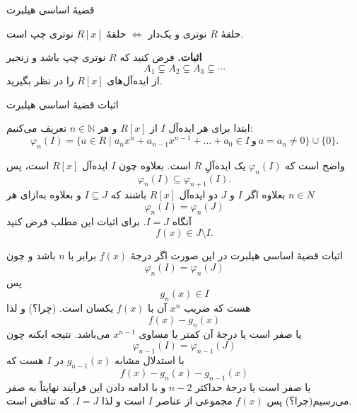 \begin{frame}{قضیهٔ اساسی هیلبرت}
    \begin{theorem}

        \begin{center}
            حلقهٔ $R$ نوتری و یک‌دار $\iff$ حلقهٔ $R[x]$ نوتری چپ است.
        \end{center}
    \end{theorem}

    \textbf{اثبات.}  فرض کنید که $R$ نوتری چپ باشد و زنجیر
    \[
        A_1 \subsetneq A_2 \subsetneq A_3 \subsetneq \cdots
    \]
    از ایده‌آل‌های $R[x]$ را در نظر بگیرید.
\end{frame}

\begin{frame}{اثبات قضیهٔ اساسی هیلبرت}


    ابتدا برای هر ایده‌آل $I$ از $R[x]$ و هر $n \in \mathbb{N}$ تعریف می‌کنیم:
    \[
        \varphi_n(I) = \{ a \in R \mid a_n x^n + a_{n-1} x^{n-1} + \dots + a_0 \in I \ \text{و} \ a = a_n \neq 0 \} \cup \{0\}.
    \]

    واضح است که $\varphi_n(I)$ یک ایده‌آلِ $R$ است.
    بعلاوه چون
    $I$
    ایده‌آل
    $R[x]$
    است، پس
    \[
        \varphi_n(I) \subseteq \varphi_{n+1}(I).
    \]
    بعلاوه اگر
    \(I\)
    و
    \(J\)
    دو ایده‌آل
    $R[x]$
    باشند که
    \(I \subseteq J\)
    و بعلاوه به‌ازای هر
    \(n \in N\)
    \[
        \varphi_n(I) = \varphi_n(J)
    \]
    آنگاه
    \(I = J\).
    برای اثبات
    این مطلب فرض کنید
    \[
        f(x) \in J \setminus I.
    \]

\end{frame}

\begin{frame}{اثبات قضیهٔ اساسی هیلبرت}
    در این صورت اگر درجهٔ
    \(f(x)\)
    برابر با
    \(n\)
    باشد و چون
    \[
        \varphi_n(I) = \varphi_n(J)
    \]
    پس
    \[
        g_n(x) \in I
    \]
    هست که ضریب
    \(x^n\)
    آن با
    \(f(x)\)
    یکسان است. (چرا؟) و لذا
    \[
        f(x) - g_n(x)
    \]
    یا صفر است یا درجهٔ آن کمتر یا مساوی
    \(x^{n-1}\)
    می‌باشد. نتیجه ایکنه چون
    \[
        \varphi_{n-1}(I) = \varphi_{n-1}(J)
    \]
    با استدلال مشابه
    \(g_{n-1}(x)\)
    در
    \(I\)
    هست که
    \[
        f(x) - g_n(x) - g_{n-1}(x)
    \]
    یا صفر است یا درجهٔ حداکثر
    \(n-2\)
    و با ادامه دادن این فرآیند نهایتاً به صفر می‌رسیم(چرا؟) پس
    \(f(x)\)
    مجموعی از عناصر
    \(I\)
    است و لذا
    \(I = J\). که تناقض است.





\end{frame}


